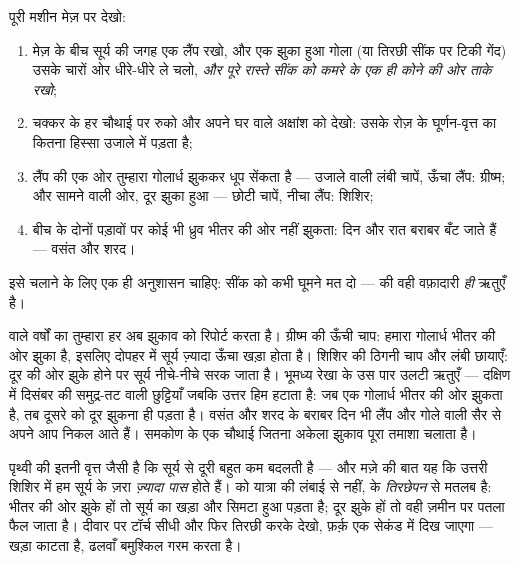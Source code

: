 \begin{method}[गोला और लैंप]\label{met:g6:sun-earth-moon:globe}
पूरी मशीन मेज़ पर देखो:
\begin{enumerate}
  \item मेज़ के बीच सूर्य की जगह एक लैंप रखो, और एक झुका हुआ गोला
        (या तिरछी सींक पर टिकी गेंद) उसके चारों ओर धीरे-धीरे ले
        चलो, \emph{और पूरे रास्ते सींक को कमरे के एक ही कोने की ओर
        ताके रखो};
  \item चक्कर के हर चौथाई पर रुको और अपने घर वाले अक्षांश को देखो:
        उसके रोज़ के घूर्णन-वृत्त का कितना हिस्सा उजाले में पड़ता
        है;
  \item लैंप की एक ओर तुम्हारा गोलार्ध झुककर धूप सेंकता है ---
        उजाले वाली लंबी चापें, ऊँचा लैंप: ग्रीष्म; और सामने वाली ओर,
        दूर झुका हुआ --- छोटी चापें, नीचा लैंप: शिशिर;
  \item बीच के दोनों पड़ावों पर कोई भी ध्रुव भीतर की ओर नहीं झुकता:
        दिन और रात बराबर बँट जाते हैं --- वसंत और शरद।
\end{enumerate}
इसे चलाने के लिए एक ही अनुशासन चाहिए: सींक को कभी घूमने मत दो ---
 की वही वफ़ादारी \emph{ही} ऋतुएँ है।
\end{method}

\begin{example}[पुराने सुराग़ों का हिसाब]\label{ex:g6:sun-earth-moon:clues}
 वाले वर्षों का तुम्हारा हर  अब झुकाव को रिपोर्ट करता
है। ग्रीष्म की ऊँची चाप: हमारा गोलार्ध भीतर की ओर झुका है, इसलिए
दोपहर में सूर्य ज़्यादा ऊँचा खड़ा होता है। शिशिर की ठिगनी चाप और लंबी
छायाएँ: दूर की ओर झुके होने पर सूर्य नीचे-नीचे सरक जाता है। भूमध्य
रेखा के उस पार उलटी ऋतुएँ --- दक्षिण में दिसंबर की समुद्र-तट वाली
छुट्टियाँ जबकि उत्तर हिम हटाता है: जब एक गोलार्ध भीतर की ओर झुकता है,
तब दूसरे को दूर झुकना ही पड़ता है। वसंत और शरद के बराबर दिन भी लैंप और
गोले वाली सैर से अपने आप निकल आते हैं। समकोण के एक चौथाई जितना अकेला
झुकाव पूरा तमाशा चलाता है।
\end{example}

\begin{remark}[दूरी नहीं --- और उसका सबूत]\label{rem:g6:sun-earth-moon:notdistance}
पृथ्वी की  इतनी वृत्त जैसी है कि सूर्य से दूरी बहुत कम बदलती है
--- और मज़े की बात यह कि उत्तरी शिशिर में हम सूर्य के ज़रा
\emph{ज़्यादा पास} होते हैं।  को यात्रा की लंबाई से नहीं, 
के \emph{तिरछेपन} से मतलब है: भीतर की ओर झुके हों तो सूर्य का 
खड़ा और सिमटा हुआ पड़ता है; दूर झुके हों तो वही  ज़मीन पर पतला
फैल जाता है। दीवार पर टॉर्च सीधी और फिर तिरछी करके देखो, फ़र्क़ एक
सेकंड में दिख जाएगा --- खड़ा  काटता है, ढलवाँ  बमुश्किल
गरम करता है।
\end{remark}


